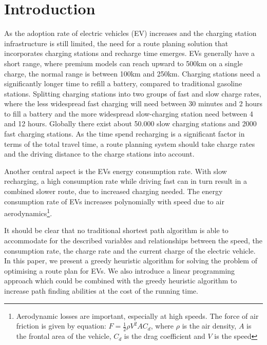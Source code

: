 \section{Introduction}

As the adoption rate of electric vehicles (EV) increases \cite{Henry2013} and the charging station infrastructure is still limited, the need for a route planing solution that incorporates charging stations and recharge time emerges. EVs generally have a short range, where premium models can reach upward to 500km on a single charge, the normal range is between 100km and 250km. Charging stations need a significantly longer time to refill a battery, compared to traditional gasoline stations. Splitting charging stations into two groups of fast and slow charge rates, where the less widespread fast charging will need between 30 minutes and 2 hours to fill a battery and the more widespread slow-charging station need between 4 and 12 hours. Globally there exist about 50.000 slow charging stations and 2000 fast charging stations\cite{Globalevoutlook}. As the time spend recharging is a significant factor in terms of the total travel time, a route planning system should take charge rates and the driving distance to the charge stations into account.

Another central aspect is the EVs energy consumption rate. With slow recharging, a high consumption rate while driving fast can in turn result in a combined slower route, due to increased charging needed. The energy consumption rate of EVs increases polynomially with speed due to air aerodynamics\footnote{Aerodynamic losses are important, especially at high speeds. The force of air friction is given by equation: $F = \frac{1}{2} \rho V^2 A C_d$, where $\rho$ is the air density, $A$ is the frontal area of the vehicle, $C_d$ is the drag coefficient and $V$ is the speed}.

It should be clear that no traditional shortest path algorithm is able to accommodate for the described variables and relationships between the speed, the consumption rate, the charge rate and the current charge of the electric vehicle. In this paper, we present a greedy heuristic algorithm for solving the problem of optimising a route plan for EVs.  We also introduce a linear programming approach which could be combined with the greedy heuristic algorithm to increase path finding abilities at the cost of the running time.  
